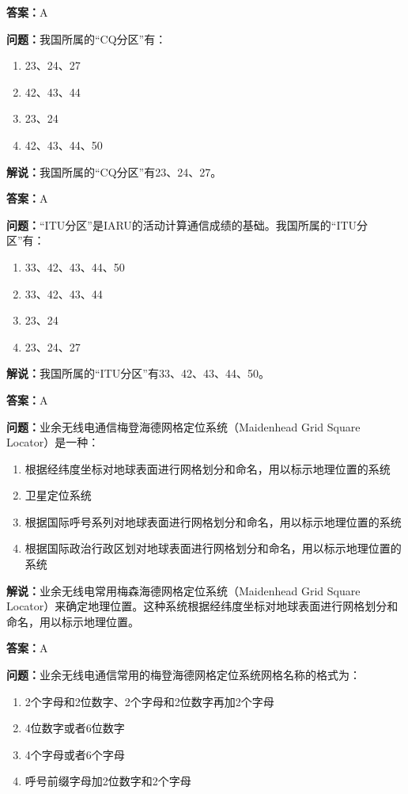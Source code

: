 \textbf{答案：}A

\textbf{问题：}我国所属的“CQ分区”有：

\begin{enumerate}[label=\Alph*), leftmargin=3em]
	\item 23、24、27
	\item 42、43、44
	\item 23、24
	\item 42、43、44、50
\end{enumerate}

\textbf{解说：}我国所属的“CQ分区”有23、24、27。

\textbf{答案：}A

\textbf{问题：}“ITU分区”是IARU的活动计算通信成绩的基础。我国所属的“ITU分区”有：

\begin{enumerate}[label=\Alph*), leftmargin=3em]
	\item 33、42、43、44、50
	\item 33、42、43、44
	\item 23、24
	\item 23、24、27
\end{enumerate}

\textbf{解说：}我国所属的“ITU分区”有33、42、43、44、50。

\textbf{答案：}A

\textbf{问题：}业余无线电通信梅登海德网格定位系统（Maidenhead Grid Square Locator）是一种：

\begin{enumerate}[label=\Alph*), leftmargin=3em]
	\item 根据经纬度坐标对地球表面进行网格划分和命名，用以标示地理位置的系统
	\item 卫星定位系统
	\item 根据国际呼号系列对地球表面进行网格划分和命名，用以标示地理位置的系统
	\item 根据国际政治行政区划对地球表面进行网格划分和命名，用以标示地理位置的系统
\end{enumerate}

\textbf{解说：}业余无线电常用梅森海德网格定位系统（Maidenhead Grid Square Locator）来确定地理位置。这种系统根据经纬度坐标对地球表面进行网格划分和命名，用以标示地理位置。

\textbf{答案：}A

\textbf{问题：}业余无线电通信常用的梅登海德网格定位系统网格名称的格式为：

\begin{enumerate}[label=\Alph*), leftmargin=3em]
	\item 2个字母和2位数字、2个字母和2位数字再加2个字母
	\item 4位数字或者6位数字
	\item 4个字母或者6个字母
	\item 呼号前缀字母加2位数字和2个字母
\end{enumerate}

